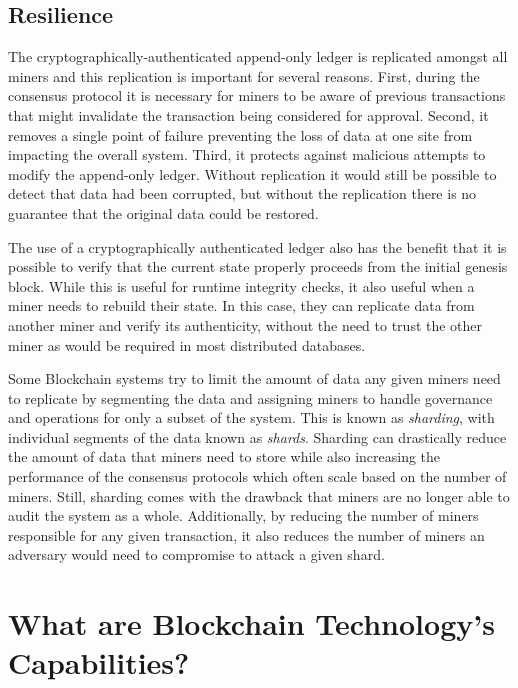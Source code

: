 \subsection{Resilience}
The cryptographically-authenticated append-only ledger is replicated amongst all miners and this replication is important for several reasons.
First, during the consensus protocol it is necessary for miners to be aware of previous transactions that might invalidate the transaction being considered for approval.
Second, it removes a single point of failure preventing the loss of data at one site from impacting the overall system.
Third, it protects against malicious attempts to modify the append-only ledger.
Without replication it would still be possible to detect that data had been corrupted, but without the replication there is no guarantee that the original data could be restored.

The use of a cryptographically authenticated ledger also has the benefit that it is possible to verify that the current state properly proceeds from the initial genesis block.
While this is useful for runtime integrity checks, it also useful when a miner needs to rebuild their state.
In this case, they can replicate data from another miner and verify its authenticity, without the need to trust the other miner as would be required in most distributed databases.

Some Blockchain systems try to limit the amount of data any given miners need to replicate by segmenting the data and assigning miners to handle governance and operations for only a subset of the system.
This is known as \emph{sharding}, with individual segments of the data known as \emph{shards}.
Sharding can drastically reduce the amount of data that miners need to store while also increasing the performance of the consensus protocols which often scale based on the number of miners.
Still, sharding comes with the drawback that miners are no longer able to audit the system as a whole.
Additionally, by reducing the number of miners responsible for any given transaction, it also reduces the number of miners an adversary would need to compromise to attack a given shard.

\section{What are Blockchain Technology's Capabilities?}
\label{sec:capabilities}

